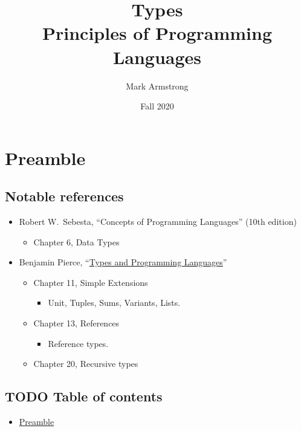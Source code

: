 \documentclass[11pt]{article}
\author{Mark Armstrong}
\date{Fall 2020}
\title{Types\\\medskip
\large Principles of Programming Languages}
\theoremstyle{definition}
\begin{document}
\maketitle

\section{Preamble}
\label{sec:org564beec}

\subsection{Notable references}
\label{sec:orgefdde63}

\begin{itemize}
\item Robert W. Sebesta, “Concepts of Programming Languages” (10th edition)
\begin{itemize}
\item Chapter 6, Data Types
\end{itemize}

\item Benjamin Pierce,
“\href{https://ebookcentral.proquest.com/lib/mcmu/detail.action?docID=3338823}{Types and Programming Languages}”
\begin{itemize}
\item Chapter 11, Simple Extensions
\begin{itemize}
\item Unit, Tuples, Sums, Variants, Lists.
\end{itemize}
\item Chapter 13, References
\begin{itemize}
\item Reference types.
\end{itemize}
\item Chapter 20, Recursive types
\end{itemize}
\end{itemize}

\subsection{{\bfseries\sffamily TODO} Table of contents}
\label{sec:orgbc45b00}

\begin{scriptsize}
\begin{itemize}
\item \hyperref[sec:org564beec]{Preamble}
\end{itemize}
\end{scriptsize}
\end{document}

